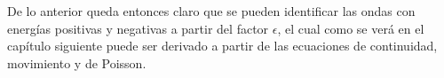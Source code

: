 \documentclass[../tesis_main_file.tex]{subfiles}
\begin{document}
De lo anterior queda entonces claro que se pueden identificar las ondas con energías positivas y negativas a partir del factor $\epsilon$, el cual como se verá en el capítulo siguiente puede ser derivado a partir de las ecuaciones de continuidad, movimiento y de Poisson.
\onlyinsubfile{}
\onlyinsubfile{}
\end{document}
